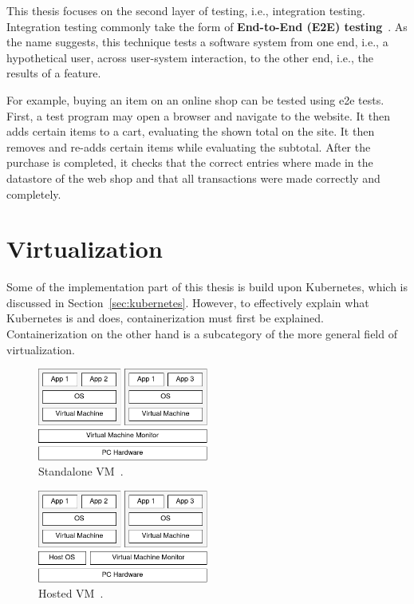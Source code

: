 This thesis focuses on the second layer of testing, i.e., integration testing.
Integration testing commonly take the form of \textbf{End-to-End (E2E) testing}~\cite{end-to-end-integration-testing-design}.
As the name suggests, this technique tests a software system from one end, i.e., a hypothetical user, across user-system interaction, to the other end, i.e., the results of a feature.

For example, buying an item on an online shop can be tested using e2e tests.
First, a test program may open a browser and navigate to the website.
It then adds certain items to a cart, evaluating the shown total on the site.
It then removes and re-adds certain items while evaluating the subtotal.
After the purchase is completed, it checks that the correct entries where made in the datastore of the web shop and that all transactions were made correctly and completely.

\section{Virtualization}\label{sec:virtualization}

Some of the implementation part of this thesis is build upon Kubernetes, which is discussed in Section~\ref{sec:kubernetes}.
However, to effectively explain what Kubernetes is and does, containerization must first be explained.
Containerization on the other hand is a subcategory of the more general field of virtualization.

\begin{figure}[H]
    \centering
    \includegraphics[width=0.5\textwidth]{img/background/standalone-vm}
    \caption{Standalone VM~\cite{a-survey-on-virtualization-technologies}.}
    \label{fig:standalone-vm}
\end{figure}

\begin{figure}[H]
    \centering
    \includegraphics[width=0.5\textwidth]{img/background/hosted-vm}
    \caption{Hosted VM~\cite{a-survey-on-virtualization-technologies}.}
    \label{fig:hosted-vm}
\end{figure}


